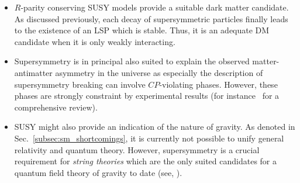 \begin{itemize}
\begin{figure}[!t]
\begin{tabular}{c}
  \end{tabular}
  \caption{Comparison of the renormalization group evolution of the couplings $\alpha_{a}^{-1}$ in the SM (dashed lines) and the MSSM (solid lines) including two-loop effects. The masses of the supersymmetric particles in the MSSM are considered as a common threshold changing between 500\gev and 1.5\tev while the strong coupling constant $\alpha_{3}(m_{Z})$ is varied between 0.117 and 0.121. Taken from~\cite{Martin:1997ns}.}
  \label{fig:couplings}
\end{figure}
 \item $R$-parity conserving SUSY models provide a suitable dark matter candidate. As discussed previously, each decay of supersymmetric particles finally leads to the existence of an LSP which is stable. Thus, it is an adequate DM candidate when it is only weakly interacting.
 \item Supersymmetry is in principal also suited to explain the observed matter-antimatter asymmetry in the universe as especially the description of supersymmetry breaking can involve $CP$-violating phases. However, these phases are strongly constraint by experimental results (\cf for instance~\cite{Ibrahim:2007fb} for a comprehensive review).
 \item SUSY might also provide an indication of the nature of gravity. As denoted in Sec.~\ref{subsec:sm_shortcomings}, it is currently not possible to unify general relativity and quantum theory. However, supersymmetry is a crucial requirement for \textit{string theories} which are the only suited candidates for a quantum field theory of gravity to date (see, \eg\cite{RevModPhys.47.123}). 
\end{itemize} 

